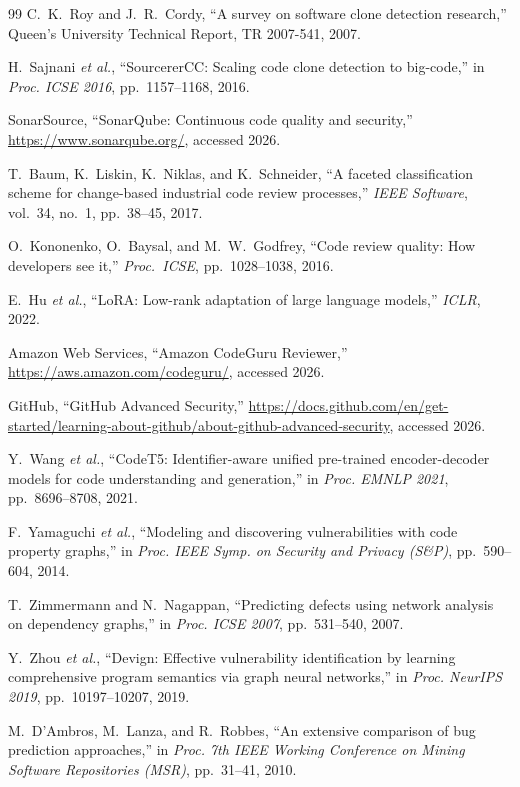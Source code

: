 \documentclass[12pt, oneside]{report}
\begin{document}
\begin{singlespace}
\begin{thebibliography}{99}
C.~K.~Roy and J.~R.~Cordy,
``A survey on software clone detection research,''
Queen's University Technical Report, TR 2007-541, 2007.

H.~Sajnani \textit{et al.},
``SourcererCC: Scaling code clone detection to big-code,''
in \textit{Proc. ICSE 2016}, pp.~1157--1168, 2016.

SonarSource,
``SonarQube: Continuous code quality and security,''
\url{https://www.sonarqube.org/}, accessed 2026.

T.~Baum, K.~Liskin, K.~Niklas, and K.~Schneider,
``A faceted classification scheme for change-based industrial code review processes,''
\textit{IEEE Software}, vol.~34, no.~1, pp.~38--45, 2017.

O.~Kononenko, O.~Baysal, and M.~W.~Godfrey,
``Code review quality: How developers see it,''
\textit{Proc.\ ICSE}, pp.~1028--1038, 2016.

E.~Hu \textit{et al.},
``LoRA: Low-rank adaptation of large language models,''
\textit{ICLR}, 2022.

Amazon Web Services,
``Amazon CodeGuru Reviewer,''
\url{https://aws.amazon.com/codeguru/}, accessed 2026.

GitHub,
``GitHub Advanced Security,''
\url{https://docs.github.com/en/get-started/learning-about-github/about-github-advanced-security}, accessed 2026.

Y.~Wang \textit{et al.},
``CodeT5: Identifier-aware unified pre-trained encoder-decoder models for code understanding
and generation,''
in \textit{Proc. EMNLP 2021}, pp.~8696--8708, 2021.

F.~Yamaguchi \textit{et al.},
``Modeling and discovering vulnerabilities with code property graphs,''
in \textit{Proc. IEEE Symp. on Security and Privacy (S\&P)}, pp.~590--604, 2014.

T.~Zimmermann and N.~Nagappan,
``Predicting defects using network analysis on dependency graphs,''
in \textit{Proc. ICSE 2007}, pp.~531--540, 2007.

Y.~Zhou \textit{et al.},
``Devign: Effective vulnerability identification by learning comprehensive program
semantics via graph neural networks,''
in \textit{Proc. NeurIPS 2019}, pp.~10197--10207, 2019.

M.~D'Ambros, M.~Lanza, and R.~Robbes,
``An extensive comparison of bug prediction approaches,''
in \textit{Proc. 7th IEEE Working Conference on Mining Software Repositories (MSR)},
pp.~31--41, 2010.


\end{thebibliography}
\end{singlespace}
\end{document}
